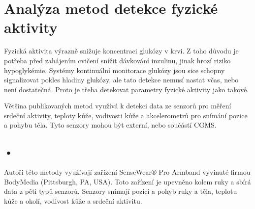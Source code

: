 \chapter{Analýza metod detekce fyzické aktivity}

Fyzická aktivita výrazně snižuje koncentraci glukózy v krvi. Z toho důvodu je potřeba před zahájením cvičení snížit dávkování inzulinu, jinak hrozí riziko hypoglykémie. Systémy kontinuální monitorace glukózy jsou sice schopny signalizovat pokles hladiny glukózy, ale tato detekce nemusí nastat včas, nebo není dostatečná. Proto je třeba detekovat parametry fyzické aktivity jako takové.

Většina publikovaných metod využívá k detekci data ze senzorů pro měření srdeční aktivity, teploty kůže, vodivosti kůže a akcelerometrů pro snímání pozice a pohybu těla. Tyto senzory mohou být externí, nebo součástí CGMS.


\section{•}

Autoři této metody využívají zařízení SenseWear® Pro Armband vyvinuté firmou BodyMedia (Pittsburgh, PA, USA). Toto zařízení je upevněno kolem ruky a sbírá data z pěti typů senzorů. Senzory snímají pozici a pohyb ruky a těla, teplotu kůže a okolí, vodivost kůže a srdeční aktivitu.